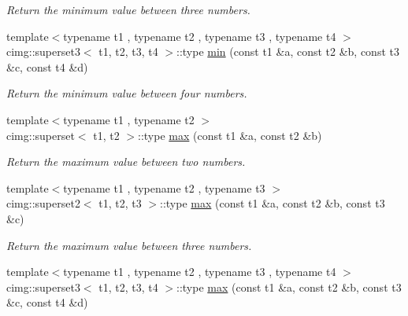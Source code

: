 \begin{DoxyCompactItemize}
\begin{DoxyCompactList}\small\item\em Return the minimum value between three numbers. \item\end{DoxyCompactList}\item 
\hypertarget{namespacecimg__library_1_1cimg_a11ac2edf216d6e3085207fbef99c8a10}{
{\footnotesize template$<$typename t1 , typename t2 , typename t3 , typename t4 $>$ }\\cimg::superset3$<$ t1, t2, t3, t4 $>$::type \hyperlink{namespacecimg__library_1_1cimg_a11ac2edf216d6e3085207fbef99c8a10}{min} (const t1 \&a, const t2 \&b, const t3 \&c, const t4 \&d)}
\label{namespacecimg__library_1_1cimg_a11ac2edf216d6e3085207fbef99c8a10}

\begin{DoxyCompactList}\small\item\em Return the minimum value between four numbers. \item\end{DoxyCompactList}\item 
\hypertarget{namespacecimg__library_1_1cimg_aef8f304ef317aed250bbb0dc2b242969}{
{\footnotesize template$<$typename t1 , typename t2 $>$ }\\cimg::superset$<$ t1, t2 $>$::type \hyperlink{namespacecimg__library_1_1cimg_aef8f304ef317aed250bbb0dc2b242969}{max} (const t1 \&a, const t2 \&b)}
\label{namespacecimg__library_1_1cimg_aef8f304ef317aed250bbb0dc2b242969}

\begin{DoxyCompactList}\small\item\em Return the maximum value between two numbers. \item\end{DoxyCompactList}\item 
\hypertarget{namespacecimg__library_1_1cimg_a3c809a146579b9d7633f5c67d1d0c04a}{
{\footnotesize template$<$typename t1 , typename t2 , typename t3 $>$ }\\cimg::superset2$<$ t1, t2, t3 $>$::type \hyperlink{namespacecimg__library_1_1cimg_a3c809a146579b9d7633f5c67d1d0c04a}{max} (const t1 \&a, const t2 \&b, const t3 \&c)}
\label{namespacecimg__library_1_1cimg_a3c809a146579b9d7633f5c67d1d0c04a}

\begin{DoxyCompactList}\small\item\em Return the maximum value between three numbers. \item\end{DoxyCompactList}\item 
\hypertarget{namespacecimg__library_1_1cimg_ac118d1956b491c6e79aa0c34ffd038dd}{
{\footnotesize template$<$typename t1 , typename t2 , typename t3 , typename t4 $>$ }\\cimg::superset3$<$ t1, t2, t3, t4 $>$::type \hyperlink{namespacecimg__library_1_1cimg_ac118d1956b491c6e79aa0c34ffd038dd}{max} (const t1 \&a, const t2 \&b, const t3 \&c, const t4 \&d)}
\label{namespacecimg__library_1_1cimg_ac118d1956b491c6e79aa0c34ffd038dd}


\end{DoxyCompactItemize}
